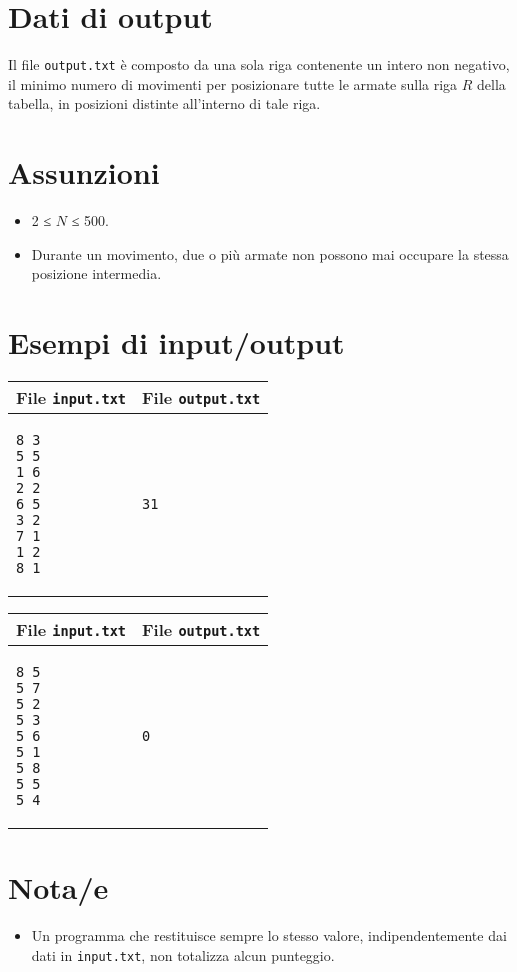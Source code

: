 \documentclass[a4paper,11pt]{article}
\begin{document}
\section*{Dati di output}
  
Il file \texttt{output.txt} è composto da 
una sola riga contenente un intero non negativo, il minimo numero di movimenti per posizionare
tutte le armate sulla riga $R$ della tabella, in posizioni
distinte all'interno di tale riga.

  \section*{Assunzioni}
  \begin{itemize}
  
    \item  2 ≤ $N$ ≤ 500.
    \item  Durante un movimento, due o più armate non possono mai occupare la stessa
  posizione intermedia.
  \end{itemize}

\section*{Esempi di input/output}

  
    \noindent
    \begin{tabular}{p{11cm}|p{5cm}}
    \toprule
    \textbf{File \texttt{input.txt}}
    & \textbf{File \texttt{output.txt}}
    \\
    \midrule
    \scriptsize
    \begin{verbatim}
8 3
5 5
1 6
2 2
6 5
3 2
7 1
1 2
8 1
\end{verbatim}
    &
    \scriptsize
    \begin{verbatim}
31
\end{verbatim}
    \\
    \bottomrule
    \end{tabular}
  
    \noindent
    \begin{tabular}{p{11cm}|p{5cm}}
    \toprule
    \textbf{File \texttt{input.txt}}
    & \textbf{File \texttt{output.txt}}
    \\
    \midrule
    \scriptsize
    \begin{verbatim}
8 5
5 7
5 2
5 3
5 6
5 1
5 8
5 5
5 4
\end{verbatim}
    &
    \scriptsize
    \begin{verbatim}
0
\end{verbatim}
    \\
    \bottomrule
    \end{tabular}
  
\section*{Nota/e}
\begin{itemize}
  
    \item Un programma che restituisce sempre lo stesso valore,
indipendentemente dai dati in \texttt{input.txt}, non totalizza
alcun punteggio.
\end{itemize}
\end{document}
